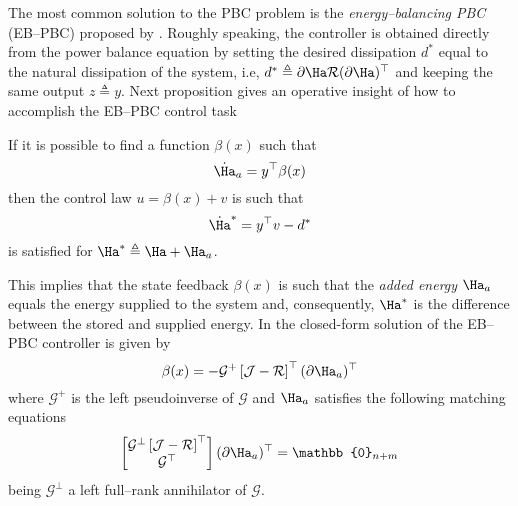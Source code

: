 %
The most common solution to the PBC problem is the \textit{energy--balancing PBC} (EB--PBC) proposed by \cite{876703}. Roughly speaking, the controller is obtained directly from the power balance equation by setting the desired dissipation $d^*$ equal to the natural dissipation of the system, i.e, $d^* \triangleq \partial\Ha\mathcal{R}(\partial\Ha)^\top$ and keeping the same output $z \triangleq y$. Next proposition gives an operative insight of how to accomplish the EB--PBC control task
\begin{prop}
If it is possible to find a function $\beta(x)$ such that
\begin{equation*}
    \dot{\Ha}_a
    =y^\top\beta(x)
\end{equation*}
then the control law $u = \beta(x)+v$ is such that 
\begin{equation*}
    \dot{\Ha}^*
    = y^\top v -d^*
\end{equation*}
is satisfied for $\Ha^* \triangleq \Ha+\Ha_a$.
\end{prop}
This implies that the state feedback $\beta(x)$ is such that the \textit{added energy} $\Ha_a$ equals the energy supplied to the system and, consequently, $\Ha^*$ is the difference between the stored and supplied energy.
In  \cite{ortega2008control} the closed-form solution of the EB--PBC controller is given by 
\[\beta(x) = -\mathcal{G}^+\left[\mathcal{J}-\mathcal{R}\right]^\top(\partial\Ha_a)^\top\]
where $\mathcal{G}^+$ is the left pseudoinverse of $\mathcal{G}$ and $\Ha_a$ satisfies the following matching equations 
\[\begin{bmatrix}\mathcal{G}^{\perp}\left[\mathcal{J}-\mathcal{R}\right]^\top\\\mathcal{G}^\top\end{bmatrix}(\partial\Ha_a)^\top = \mathbb{0}_{n+m}\]
being $\mathcal{G}^{\perp}$ a left full--rank annihilator of $\mathcal{G}$.

